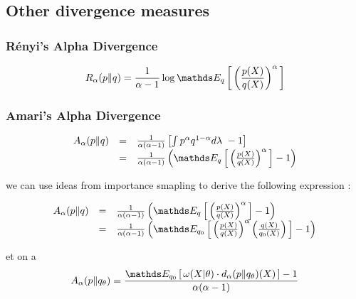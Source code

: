 \subsection{Other divergence measures}

\subsubsection{Rényi's Alpha Divergence}

$$
R_\alpha(p \Vert q) = \frac 1 {\alpha - 1} \log \esperanceloi q { \left( \frac {p(X)} {q(X)} \right)^\alpha }
$$



\subsubsection{Amari's Alpha Divergence}

$$
\begin{array}{lcl}
A_\alpha( p \Vert q ) &=& \frac{1}{\alpha( \alpha - 1 )} \left[ \int p^\alpha q^{1 - \alpha} d\lambda \ -1 \right]  
\\
&=& \frac{1}{\alpha( \alpha - 1 )} \left( \esperanceloi q { \left( \frac {p(X)} {q(X)} \right)^\alpha } - 1\right)
\end{array}
$$

we can use ideas from importance smapling to derive the following expression :


\[
\begin{array}{lcl}

A_\alpha( p \Vert q ) &=& \frac{1}{\alpha( \alpha - 1 )} \left( \esperanceloi q { \left( \frac {p(X)} {q(X)} \right)^\alpha } - 1\right)

\\ 
&=&  \frac{1}{\alpha( \alpha - 1 )} \left( \esperanceloi {q_0} { \left( \frac {p(X)} {q(X)} \right)^\alpha  \left( \frac{q(X)}{q_0(X)} \right) } - 1\right)
\\
\end{array}
\]


et on a $$A_\alpha( p \Vert q_\theta ) = \frac {\esperanceloi {q_0} { \omega(X \vert \theta) \cdot d_\alpha(p \Vert q_\theta )(X) } - 1 }{\alpha ( \alpha - 1 )}$$